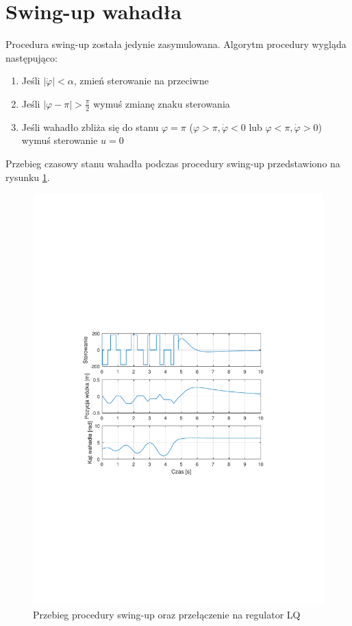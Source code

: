 \documentclass[12pt]{article}
\begin{document}
\section{Swing-up wahadła}

Procedura swing-up została jedynie zasymulowana. Algorytm procedury wygląda
następująco:

\begin{enumerate}
  \item Jeśli $|\dot{\varphi}| < \alpha$, zmień sterowanie na przeciwne
  \item Jeśli $|\varphi - \pi| > \frac{\pi}{2}$ wymuś zmianę znaku sterowania
  \item Jeśli wahadło zbliża się do stanu $\varphi = \pi$ ($\varphi > \pi,
  \dot{\varphi} < 0$ lub $\varphi < \pi, \dot{\varphi} > 0$) wymuś sterowanie
  $u = 0$
\end{enumerate}

Przebieg czasowy stanu wahadła podczas procedury swing-up przedstawiono na
rysunku \ref{rys:swingup}.

\begin{figure}[!htb]
    \begin{center}
        \includegraphics[width=16cm,trim=3cm 9cm 3cm 9cm,clip]
        {../res/img/swingup.pdf}
    \end{center}
    \caption{Przebieg procedury swing-up oraz przełączenie na regulator LQ}
    \label{rys:swingup}
\end{figure}
\end{document}
